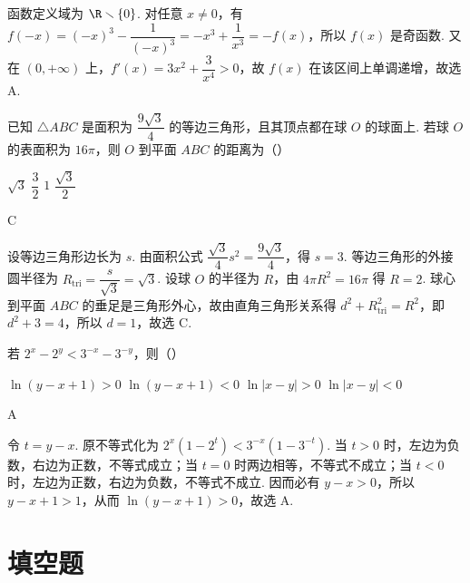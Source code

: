 \begin{solution}
函数定义域为 \(\R\smallsetminus\{0\}\). 对任意 \(x\ne0\)，有 \(f(-x)=(-x)^3-\dfrac{1}{(-x)^3}=-x^3+\dfrac1{x^3}=-f(x)\)，所以 \(f(x)\) 是奇函数. 又在 \((0,+\infty)\) 上，\(f'(x)=3x^2+\dfrac{3}{x^4}>0\)，故 \(f(x)\) 在该区间上单调递增，故选 A.
\end{solution}

\begin{problem}
已知 \(\triangle ABC\) 是面积为 \(\dfrac{9\sqrt3}{4}\) 的等边三角形，且其顶点都在球 \(O\) 的球面上. 若球 \(O\) 的表面积为 \(16\pi\)，则 \(O\) 到平面 \(ABC\) 的距离为（\quad）

\choices
    {\(\sqrt3\)}
    {\(\dfrac{3}{2}\)}
    {\(1\)}
    {\(\dfrac{\sqrt3}{2}\)}
\end{problem}

\begin{answer}
C
\end{answer}

\begin{solution}
设等边三角形边长为 \(s\). 由面积公式 \(\dfrac{\sqrt3}{4}s^2=\dfrac{9\sqrt3}{4}\)，得 \(s=3\). 等边三角形的外接圆半径为 \(R_{\mathrm{tri}}=\dfrac{s}{\sqrt3}=\sqrt3\). 设球 \(O\) 的半径为 \(R\)，由 \(4\pi R^2=16\pi\) 得 \(R=2\). 球心到平面 \(ABC\) 的垂足是三角形外心，故由直角三角形关系得 \(d^2+R_{\mathrm{tri}}^2=R^2\)，即 \(d^2+3=4\)，所以 \(d=1\)，故选 C.
\end{solution}

\begin{problem}
若 \(2^x-2^y<3^{-x}-3^{-y}\)，则（\quad）

\choices
    {\(\ln(y-x+1)>0\)}
    {\(\ln(y-x+1)<0\)}
    {\(\ln\lvert x-y\rvert>0\)}
    {\(\ln\lvert x-y\rvert<0\)}
\end{problem}

\begin{answer}
A
\end{answer}

\begin{solution}
令 \(t=y-x\). 原不等式化为 \(2^x(1-2^t)<3^{-x}(1-3^{-t})\). 当 \(t>0\) 时，左边为负数，右边为正数，不等式成立；当 \(t=0\) 时两边相等，不等式不成立；当 \(t<0\) 时，左边为正数，右边为负数，不等式不成立. 因而必有 \(y-x>0\)，所以 \(y-x+1>1\)，从而 \(\ln(y-x+1)>0\)，故选 A.
\end{solution}

\section{填空题}

